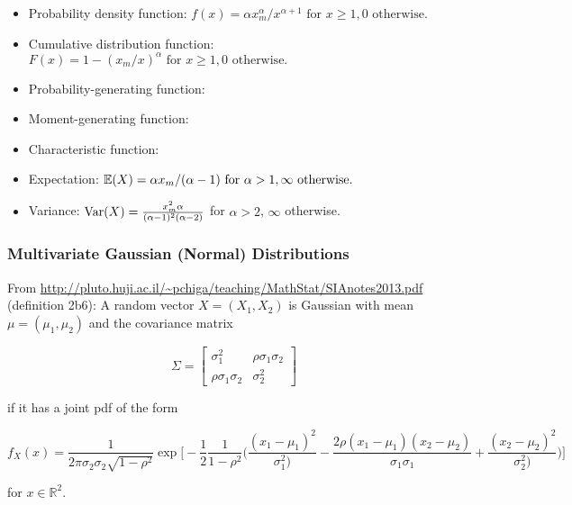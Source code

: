 \begin{itemize}

\item Probability density function: \(f(x) = \alpha x_m^\alpha/x^{\alpha + 1} \text{ for } x \geq 1, 0 \text{ otherwise.} \)

\item Cumulative distribution function: \(F(x) = 1 - (x_m/x)^{\alpha} \text{ for } x \geq 1, 0 \text{ otherwise.}\)

\item Probability-generating function:

\item Moment-generating function:

\item Characteristic function:

\item Expectation: \(\E(X) = \alpha x_m/(\alpha -1) \text{ for } \alpha > 1, \infty \text{ otherwise.}\)

\item Variance: \(\Var(X) = \frac{x_m^2\alpha}{(\alpha-1)^2(\alpha - 2)}\) for \(\alpha > 2\), \(\infty\) otherwise.

\end{itemize}


\subsubsection{Multivariate Gaussian (Normal) Distributions}

\begin{definition} From \url{http://pluto.huji.ac.il/~pchiga/teaching/MathStat/SIAnotes2013.pdf} (definition 2b6): A random vector \(X = (X_1, X_2)\) is Gaussian with mean \(\mu = (\mu_1, \mu_2)\) and the covariance matrix

\[
\Sigma = \begin{bmatrix}
   \sigma_1^2 & \rho \sigma_1 \sigma_2 \\
     \rho \sigma_1 \sigma_2     &\sigma_2^2
\end{bmatrix}
\]

if it has a joint pdf of the form

\[
f_X(x) = \frac{1}{2 \pi \sigma_2 \sigma_2 \sqrt{1 - \rho^2}} \exp \bigg[ - \frac{1}{2} \frac{1}{1 - \rho^2} \bigg( \frac{(x_1 - \mu_1)^2}{\sigma_1^2)} - \frac{2 \rho (x_1 - \mu_1)(x_2 - \mu_2)}{\sigma_1 \sigma_1} +  \frac{(x_2 - \mu_2)^2}{\sigma_2^2)} \bigg) \bigg]
\]

for \(x \in \mathbb{R}^2\).
\end{definition}

